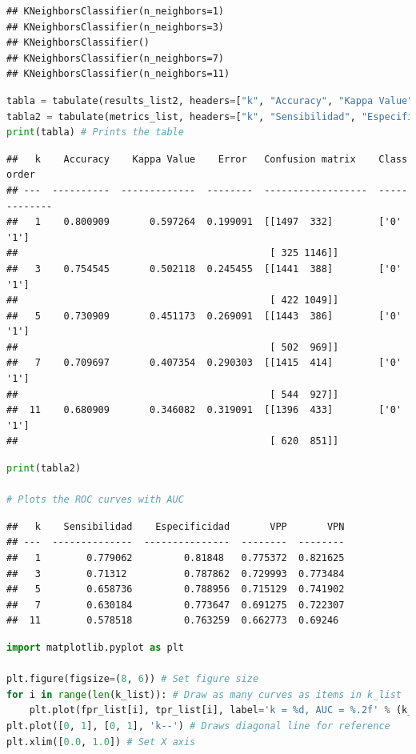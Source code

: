\documentclass[
]{article}
\begin{document}
\begin{lstlisting}
## KNeighborsClassifier(n_neighbors=1)
## KNeighborsClassifier(n_neighbors=3)
## KNeighborsClassifier()
## KNeighborsClassifier(n_neighbors=7)
## KNeighborsClassifier(n_neighbors=11)
\end{lstlisting}

\begin{lstlisting}[language=Python]
tabla = tabulate(results_list2, headers=["k", "Accuracy", "Kappa Value", "Error ", "Confusion matrix", "Class order"])
tabla2 = tabulate(metrics_list, headers=["k", "Sensibilidad", "Especificidad", "VPP", "VPN"])
print(tabla) # Prints the table
\end{lstlisting}

\begin{lstlisting}
##   k    Accuracy    Kappa Value    Error   Confusion matrix    Class order
## ---  ----------  -------------  --------  ------------------  -------------
##   1    0.800909       0.597264  0.199091  [[1497  332]        ['0' '1']
##                                            [ 325 1146]]
##   3    0.754545       0.502118  0.245455  [[1441  388]        ['0' '1']
##                                            [ 422 1049]]
##   5    0.730909       0.451173  0.269091  [[1443  386]        ['0' '1']
##                                            [ 502  969]]
##   7    0.709697       0.407354  0.290303  [[1415  414]        ['0' '1']
##                                            [ 544  927]]
##  11    0.680909       0.346082  0.319091  [[1396  433]        ['0' '1']
##                                            [ 620  851]]
\end{lstlisting}

\begin{lstlisting}[language=Python]
print(tabla2)

# Plots the ROC curves with AUC
\end{lstlisting}

\begin{lstlisting}
##   k    Sensibilidad    Especificidad       VPP       VPN
## ---  --------------  ---------------  --------  --------
##   1        0.779062         0.81848   0.775372  0.821625
##   3        0.71312          0.787862  0.729993  0.773484
##   5        0.658736         0.788956  0.715129  0.741902
##   7        0.630184         0.773647  0.691275  0.722307
##  11        0.578518         0.763259  0.662773  0.69246
\end{lstlisting}

\begin{lstlisting}[language=Python]
import matplotlib.pyplot as plt

plt.figure(figsize=(8, 6)) # Set figure size
for i in range(len(k_list)): # Draw as many curves as items in k_list
    plt.plot(fpr_list[i], tpr_list[i], label='k = %d, AUC = %.2f' % (k_list[i], roc_auc_list[i])) # Plots the curve for each k and sets the AUC values for the legend
plt.plot([0, 1], [0, 1], 'k--') # Draws diagonal line for reference
plt.xlim([0.0, 1.0]) # Set X axis
\end{lstlisting}
\end{document}
